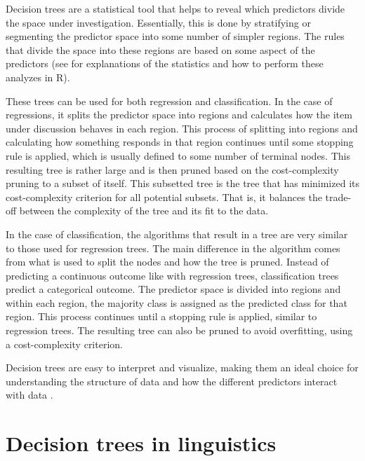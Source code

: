 Decision trees are a statistical tool that helps to reveal which predictors divide the space under investigation. Essentially, this is done by stratifying or segmenting the predictor space into some number of simpler regions. The rules that divide the space into these regions are based on some aspect of the predictors (see \cite{hastieElementsStatisticalLearning2009,jamesIntroductionStatisticalLearning2021} for explanations of the statistics and how to perform these analyzes in R). 

These trees can be used for both regression and classification. In the case of regressions, it splits the predictor space into regions and calculates how the item under discussion behaves in each region. This process of splitting into regions and calculating how something responds in that region continues until some stopping rule is applied, which is usually defined to some number of terminal nodes. This resulting tree is rather large and is then pruned based on the cost-complexity pruning to a subset of itself. This subsetted tree is the tree that has minimized its cost-complexity criterion for all potential subsets. That is, it balances the trade-off between the complexity of the tree and its fit to the data. 

In the case of classification, the algorithms that result in a tree are very similar to those used for regression trees. The main difference in the algorithm comes from what is used to split the nodes and how the tree is pruned. Instead of predicting a continuous outcome like with regression trees, classification trees predict a categorical outcome. The predictor space is divided into regions and within each region, the majority class is assigned as the predicted class for that region. This process continues until a stopping rule is applied, similar to regression trees. The resulting tree can also be pruned to avoid overfitting, using a cost-complexity criterion.

Decision trees are easy to interpret and visualize, making them an ideal choice for understanding the structure of data and how the different predictors interact with data \citep{hastieElementsStatisticalLearning2009,jamesIntroductionStatisticalLearning2021}.

\section{Decision trees in linguistics}\label{sec:dt_linguistics}

